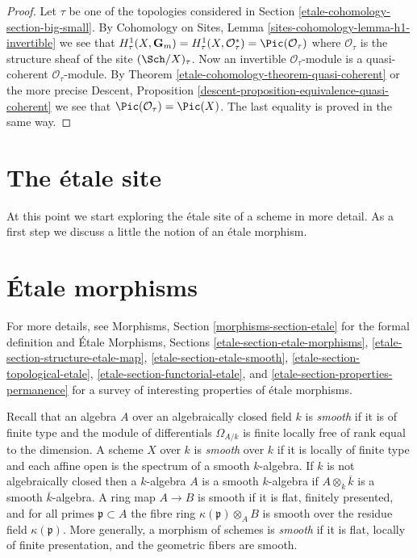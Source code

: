 \begin{proof}
Let $\tau$ be one of the topologies considered in
Section \ref{etale-cohomology-section-big-small}.
By
Cohomology on Sites, Lemma
\ref{sites-cohomology-lemma-h1-invertible}
we see that
$H^1_\tau(X, \mathbf{G}_m) =
H^1_\tau(X, \mathcal{O}_\tau^*) =
\Pic(\mathcal{O}_\tau)$
where $\mathcal{O}_\tau$ is the structure sheaf of the site
$(\Sch/X)_\tau$. Now an invertible $\mathcal{O}_\tau$-module
is a quasi-coherent $\mathcal{O}_\tau$-module.
By Theorem \ref{etale-cohomology-theorem-quasi-coherent} or the more precise
Descent, Proposition \ref{descent-proposition-equivalence-quasi-coherent}
we see that $\Pic(\mathcal{O}_\tau) = \Pic(X)$.
The last equality is proved in the same way.
\end{proof}

\section{The \'etale site}
\label{etale-cohomology-section-etale-site}
At this point we start exploring the \'etale site of a scheme in
more detail. As a first step we discuss a little the notion of an
\'etale morphism.

\section{\'Etale morphisms}
\label{etale-cohomology-section-etale-morphism}
For more details, see
Morphisms, Section \ref{morphisms-section-etale}
for the formal definition and
\'Etale Morphisms, Sections
\ref{etale-section-etale-morphisms},
\ref{etale-section-structure-etale-map},
\ref{etale-section-etale-smooth},
\ref{etale-section-topological-etale},
\ref{etale-section-functorial-etale}, and
\ref{etale-section-properties-permanence}
for a survey of interesting properties of \'etale morphisms.

\medskip\noindent
Recall that an algebra $A$ over an algebraically closed field $k$ is
{\it smooth} if it is of finite type and the module of differentials
$\Omega_{A/k}$ is finite locally free of rank equal to the dimension.
A scheme $X$ over $k$ is {\it smooth} over $k$ if it is locally of finite
type and each affine open is the spectrum of a smooth $k$-algebra.
If $k$ is not algebraically closed then a $k$-algebra $A$ is
a smooth $k$-algebra if $A \otimes_k \overline{k}$ is a smooth
$\overline{k}$-algebra. A ring map $A \to B$ is smooth if it is
flat, finitely presented, and for all primes $\mathfrak p \subset A$
the fibre ring $\kappa(\mathfrak p) \otimes_A B$ is smooth over the residue
field $\kappa(\mathfrak p)$. More generally, a morphism of schemes is
{\it smooth} if it is flat, locally of finite presentation, and the
geometric fibers are smooth.

